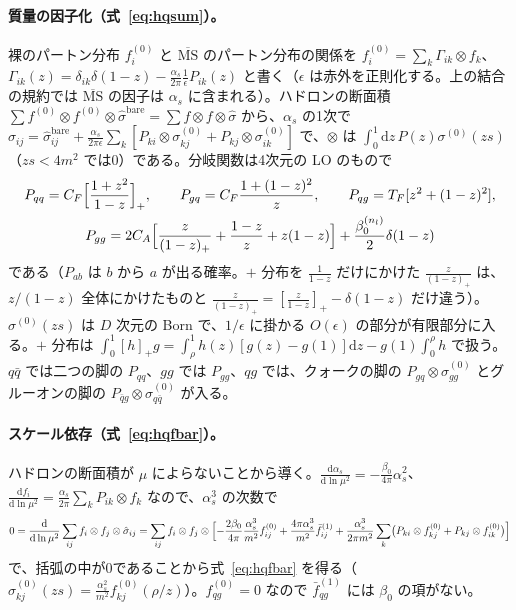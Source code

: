 \documentclass[a4paper,10pt]{ltjsarticle}
\newcommand{\dd}{\mathrm{d}}
\newcommand{\MSbar}{\overline{\mathrm{MS}}}
\begin{document}
\paragraph{質量の因子化（式~\eqref{eq:hqsum}）。}裸のパートン分布 $f_i^{(0)}$ と $\MSbar$ のパートン分布の関係を $f^{(0)}_i=\sum_k\Gamma_{ik}\otimes f_k$、$\Gamma_{ik}(z)=\delta_{ik}\delta(1-z)-\frac{\alpha_s}{2\pi}\frac1\epsilon P_{ik}(z)$ と書く（$\epsilon$ は赤外を正則化する。上の結合の規約では $\MSbar$ の因子は $\alpha_s$ に含まれる）。ハドロンの断面積 $\sum f^{(0)}\otimes f^{(0)}\otimes\hat\sigma^{\mathrm{bare}}=\sum f\otimes f\otimes\hat\sigma$ から、$\alpha_s$ の1次で $\hat\sigma_{ij}=\hat\sigma^{\mathrm{bare}}_{ij}+\frac{\alpha_s}{2\pi\epsilon}\sum_k[P_{ki}\otimes\sigma^{(0)}_{kj}+P_{kj}\otimes\sigma^{(0)}_{ik}]$ で、$\otimes$ は $\int_0^1\dd z\,P(z)\sigma^{(0)}(zs)$（$zs<4m^2$ では0）である。分岐関数は4次元の LO のもので
\begin{gather*}
P_{qq}=C_F\Bigl[\frac{1+z^2}{1-z}\Bigr]_+,\qquad P_{gq}=C_F\frac{1+(1-z)^2}z,\qquad P_{qg}=T_F[z^2+(1-z)^2],\\
P_{gg}=2C_A\Bigl[\frac{z}{(1-z)_+}+\frac{1-z}z+z(1-z)\Bigr]+\frac{\beta_0^{(n_l)}}2\delta(1-z)
\end{gather*}
である（$P_{ab}$ は $b$ から $a$ が出る確率。$+$ 分布を $\frac1{1-z}$ だけにかけた $\frac z{(1-z)_+}$ は、$z/(1-z)$ 全体にかけたものと $\frac z{(1-z)_+}=[\frac z{1-z}]_+-\delta(1-z)$ だけ違う）。$\sigma^{(0)}(zs)$ は $D$ 次元の Born で、$1/\epsilon$ に掛かる $O(\epsilon)$ の部分が有限部分に入る。$+$ 分布は $\int_0^1[h]_+g=\int_\rho^1h(z)[g(z)-g(1)]\dd z-g(1)\int_0^\rho h$ で扱う。$q\bar q$ では二つの脚の $P_{qq}$、$gg$ では $P_{gg}$、$qg$ では、クォークの脚の $P_{gq}\otimes\sigma^{(0)}_{gg}$ とグルーオンの脚の $P_{\bar qg}\otimes\sigma^{(0)}_{q\bar q}$ が入る。

\paragraph{スケール依存（式~\eqref{eq:hqfbar}）。}ハドロンの断面積が $\mu$ によらないことから導く。$\frac{\dd\alpha_s}{\dd\ln\mu^2}=-\frac{\beta_0}{4\pi}\alpha_s^2$、$\frac{\dd f_i}{\dd\ln\mu^2}=\frac{\alpha_s}{2\pi}\sum_kP_{ik}\otimes f_k$ なので、$\alpha_s^3$ の次数で
\begin{equation*}
0=\frac{\dd}{\dd\ln\mu^2}\sum_{ij}f_i\otimes f_j\otimes\hat\sigma_{ij}
=\sum_{ij}f_i\otimes f_j\otimes\Bigl[-\frac{2\beta_0}{4\pi}\frac{\alpha_s^3}{m^2}f^{(0)}_{ij}+\frac{4\pi\alpha_s^3}{m^2}\bar f^{(1)}_{ij}+\frac{\alpha_s^3}{2\pi m^2}\sum_k\bigl(P_{ki}\otimes f^{(0)}_{kj}+P_{kj}\otimes f^{(0)}_{ik}\bigr)\Bigr]
\end{equation*}
で、括弧の中が0であることから式~\eqref{eq:hqfbar} を得る（$\sigma^{(0)}_{kj}(zs)=\frac{\alpha_s^2}{m^2}f^{(0)}_{kj}(\rho/z)$）。$f^{(0)}_{qg}=0$ なので $\bar f^{(1)}_{qg}$ には $\beta_0$ の項がない。
\end{document}
